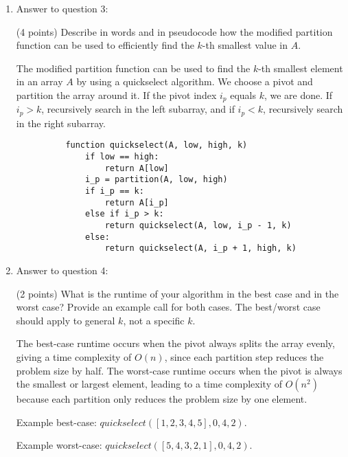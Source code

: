 \documentclass[11pt]{article}
\begin{document}
\begin{enumerate}
	\item Answer to question 3:

	      (4 points) Describe in words and in pseudocode how the modified partition function can be used to efficiently find the \(k\)-th smallest value in \(A\).

	      The modified partition function can be used to find the \(k\)-th smallest element in an array \(A\) by using a quickselect algorithm. We choose a pivot and partition the array around it. If the pivot index \(i_p\) equals \(k\), we are done. If \(i_p > k\), recursively search in the left subarray, and if \(i_p < k\), recursively search in the right subarray.

	      \begin{verbatim}
	      function quickselect(A, low, high, k)
	          if low == high:
	              return A[low]
	          i_p = partition(A, low, high)
	          if i_p == k:
	              return A[i_p]
	          else if i_p > k:
	              return quickselect(A, low, i_p - 1, k)
	          else:
	              return quickselect(A, i_p + 1, high, k)
	      \end{verbatim}

	\item Answer to question 4:

	      (2 points) What is the runtime of your algorithm in the best case and in the worst case? Provide an example call for both cases. The best/worst case should apply to general \(k\), not a specific \(k\).

	      The best-case runtime occurs when the pivot always splits the array evenly, giving a time complexity of \(O(n)\), since each partition step reduces the problem size by half. The worst-case runtime occurs when the pivot is always the smallest or largest element, leading to a time complexity of \(O(n^2)\) because each partition only reduces the problem size by one element.

	      Example best-case: \(quickselect([1,2,3,4,5], 0, 4, 2)\).

	      Example worst-case: \(quickselect([5,4,3,2,1], 0, 4, 2)\).

\end{enumerate}
\end{document}

